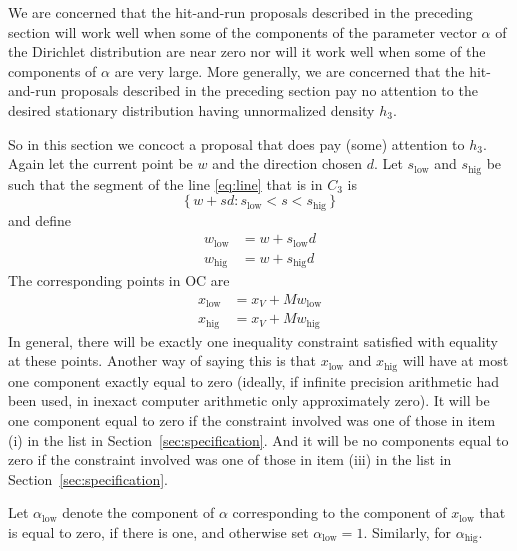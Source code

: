 \documentclass[11pt]{article}
\newcommand{\set}[1]{\{\, #1 \,\}}
\begin{document}
We are concerned that the hit-and-run proposals described in the
preceding section will work well when some of the components of the
parameter vector $\alpha$ of the Dirichlet distribution are near zero nor
will it work well when some of the components of $\alpha$ are very large.
More generally, we are concerned that the hit-and-run proposals described
in the preceding section pay no attention to the desired stationary
distribution having unnormalized density $h_3$.

So in this section we concoct a proposal that does pay (some) attention
to $h_3$.  Again let the current point be $w$ and the direction chosen $d$.
Let $s_\text{low}$ and $s_\text{hig}$ be such that the segment of the line
\eqref{eq:line} that is in $C_3$ is
$$
   \set{ w + s d : s_\text{low} < s < s_\text{hig} }
$$
and define
\begin{align*}
   w_\text{low} & = w + s_\text{low} d
   \\
   w_\text{hig} & = w + s_\text{hig} d
\end{align*}
The corresponding points in OC are
\begin{align*}
   x_\text{low} & = x_V + M w_\text{low}
   \\
   x_\text{hig} & = x_V + M w_\text{hig}
\end{align*}
In general, there will be exactly one inequality constraint satisfied with
equality at these points.
Another way of saying this is that $x_\text{low}$ and $x_\text{hig}$ will
have at most one component exactly equal to zero (ideally, if infinite
precision arithmetic had been used, in inexact computer arithmetic only
approximately zero).  It will be one component equal to zero if the constraint
involved was one of those in item (i) in the list
in Section~\ref{sec:specification}.  And it will be no components equal to zero
if the constraint involved was one of those in item (iii) in the list in
Section~\ref{sec:specification}.

Let $\alpha_\text{low}$ denote the
component of $\alpha$ corresponding to the component of $x_\text{low}$ that
is equal to zero, if there is one, and otherwise set $\alpha_\text{low} = 1$.
Similarly, for $\alpha_\text{hig}$.
\end{document}
